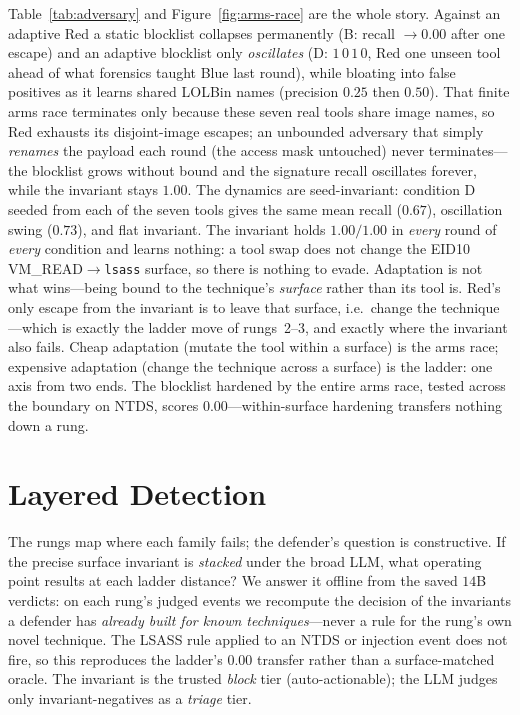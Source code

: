 \documentclass[sigconf,nonacm]{acmart}
\begin{document}
Table~\ref{tab:adversary} and Figure~\ref{fig:arms-race} are the whole story. Against an adaptive Red a static
blocklist collapses permanently (B: recall $\rightarrow 0.00$ after one escape)
and an adaptive blocklist only \emph{oscillates} (D: $1\,0\,1\,0$, Red one unseen
tool ahead of what forensics taught Blue last round), while bloating into
false positives as it learns shared LOLBin names (precision $0.25$ then $0.50$).
That finite arms race terminates only because these seven real tools share image
names, so Red exhausts its disjoint-image escapes; an unbounded adversary that
simply \emph{renames} the payload each round (the access mask untouched) never
terminates---the blocklist grows without bound and the signature recall
oscillates forever, while the invariant stays $1.00$. The dynamics are
seed-invariant: condition D seeded from each of the seven tools gives the same
mean recall ($0.67$), oscillation swing ($0.73$), and flat invariant.
The invariant holds $1.00/1.00$ in \emph{every} round of \emph{every}
condition and learns nothing: a tool swap does not change the
EID10 VM\_READ$\rightarrow$\texttt{lsass} surface, so there is nothing to evade.
Adaptation is not what wins---being bound to the technique's \emph{surface}
rather than its tool is. Red's only escape from the invariant is to leave that
surface, i.e.\ change the technique---which is exactly the ladder move of
rungs~2--3, and exactly where the invariant also fails. Cheap adaptation (mutate
the tool within a surface) is the arms race; expensive adaptation (change the
technique across a surface) is the ladder: one axis from two ends. The blocklist
hardened by the entire arms race, tested across the boundary on NTDS, scores
$0.00$---within-surface hardening transfers nothing down a rung.

\section{Layered Detection}
\label{sec:layering}
The rungs map where each family fails; the defender's question is constructive.
If the precise surface invariant is \emph{stacked} under the broad LLM, what
operating point results at each ladder distance? We answer it offline from the
saved $14$B verdicts: on each rung's judged events we recompute the decision of
the invariants a defender has \emph{already built for known techniques}---never
a rule for the rung's own novel technique. The LSASS rule applied to an NTDS or
injection event does not fire, so this reproduces the ladder's $0.00$ transfer
rather than a surface-matched oracle. The invariant is the trusted \emph{block}
tier (auto-actionable); the LLM judges only invariant-negatives as a
\emph{triage} tier.
\end{document}
